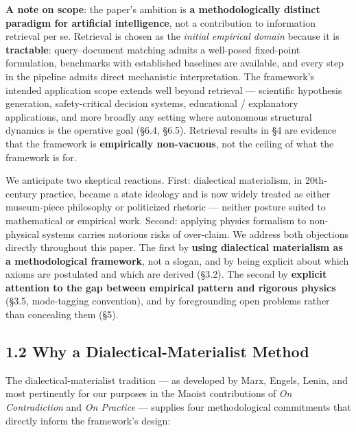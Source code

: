 \documentclass[
]{article}
\begin{document}
\textbf{A note on scope}: the paper's ambition is \textbf{a
methodologically distinct paradigm for artificial intelligence}, not a
contribution to information retrieval per se. Retrieval is chosen as the
\emph{initial empirical domain} because it is \textbf{tractable}:
query--document matching admits a well-posed fixed-point formulation,
benchmarks with established baselines are available, and every step in
the pipeline admits direct mechanistic interpretation. The framework's
intended application scope extends well beyond retrieval --- scientific
hypothesis generation, safety-critical decision systems, educational /
explanatory applications, and more broadly any setting where autonomous
structural dynamics is the operative goal (§6.4, §6.5). Retrieval
results in §4 are evidence that the framework is \textbf{empirically
non-vacuous}, not the ceiling of what the framework is for.

We anticipate two skeptical reactions. First: dialectical materialism,
in 20th-century practice, became a state ideology and is now widely
treated as either museum-piece philosophy or politicized rhetoric ---
neither posture suited to mathematical or empirical work. Second:
applying physics formalism to non-physical systems carries notorious
risks of over-claim. We address both objections directly throughout this
paper. The first by \textbf{using dialectical materialism as a
methodological framework}, not a slogan, and by being explicit about
which axioms are postulated and which are derived (§3.2). The second by
\textbf{explicit attention to the gap between empirical pattern and
rigorous physics} (§3.5, mode-tagging convention), and by foregrounding
open problems rather than concealing them (§5).

\hypertarget{why-a-dialectical-materialist-method}{%
\subsection{1.2 Why a Dialectical-Materialist
Method}\label{why-a-dialectical-materialist-method}}

The dialectical-materialist tradition --- as developed by Marx, Engels,
Lenin, and most pertinently for our purposes in the Maoist contributions
of \emph{On Contradiction} and \emph{On Practice} --- supplies four
methodological commitments that directly inform the framework's design:
\end{document}

